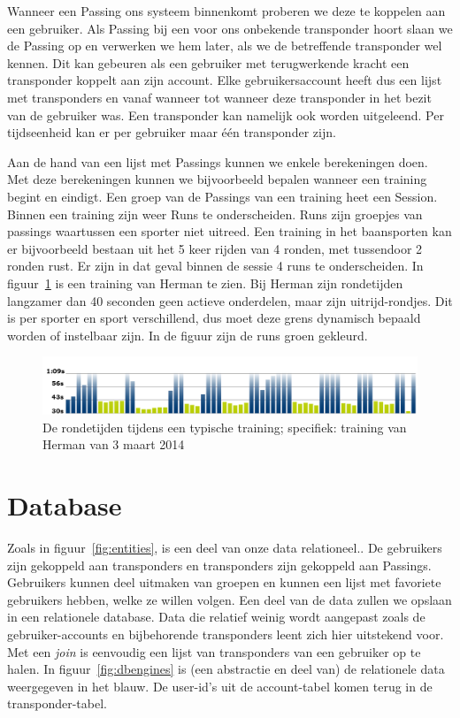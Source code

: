 Wanneer een Passing ons systeem binnenkomt proberen we deze te koppelen aan een gebruiker. Als Passing bij een voor ons onbekende transponder hoort slaan we de Passing op en verwerken we hem later, als we de betreffende transponder wel kennen. Dit kan gebeuren als een gebruiker met terugwerkende kracht een transponder koppelt aan zijn account. Elke gebruikersaccount heeft dus een lijst met transponders en vanaf wanneer tot wanneer deze transponder in het bezit van de gebruiker was. Een transponder kan namelijk ook worden uitgeleend. Per tijdseenheid kan er per gebruiker maar één transponder zijn.

Aan de hand van een lijst met Passings kunnen we enkele berekeningen doen. Met deze berekeningen kunnen we bijvoorbeeld bepalen wanneer een training begint en eindigt. Een groep van de Passings van een training heet een Session. Binnen een training zijn weer Runs te onderscheiden. Runs zijn groepjes van passings waartussen een sporter niet uitreed. Een training in het baansporten kan er bijvoorbeeld bestaan uit het 5 keer rijden van 4 ronden, met tussendoor 2 ronden rust. Er zijn in dat geval binnen de sessie 4 runs te onderscheiden. In figuur~\ref{fig:sessions} is een training van Herman te zien. Bij Herman zijn rondetijden langzamer dan 40 seconden  geen actieve onderdelen, maar zijn uitrijd-rondjes. Dit is per sporter en sport verschillend, dus moet deze grens dynamisch bepaald worden of instelbaar zijn. In de figuur zijn de runs groen gekleurd.

\begin{figure}
\centering
\includegraphics[width=1\textwidth]{style/images/MyLapsHerman}
\caption{De rondetijden tijdens een typische training; specifiek: training van Herman van 3 maart 2014}
\label{fig:sessions}
\end{figure}

\section{Database}
\label{sec:database}

Zoals in figuur~\ref{fig:entities}, is een deel van onze data relationeel.. De gebruikers zijn gekoppeld aan transponders en transponders zijn gekoppeld aan Passings. Gebruikers kunnen deel uitmaken van groepen en kunnen een lijst met favoriete gebruikers hebben, welke ze willen volgen. Een deel van de data zullen we opslaan in een relationele database. Data die relatief weinig wordt aangepast zoals de gebruiker-accounts en bijbehorende transponders leent zich hier uitstekend voor. Met een \textit{join} is eenvoudig een lijst van transponders van een gebruiker op te halen. In figuur~\ref{fig:dbengines} is (een abstractie en deel van) de relationele data weergegeven in het blauw. De user-id's uit de account-tabel komen terug in de transponder-tabel.

